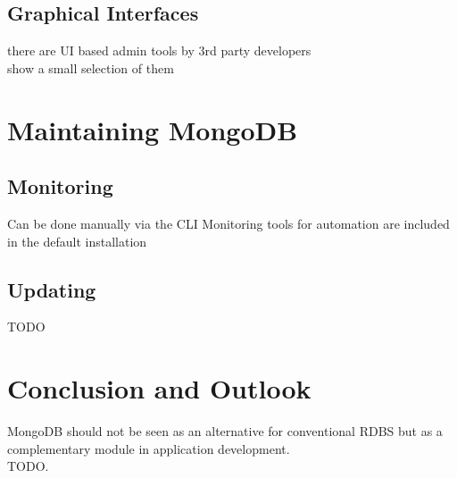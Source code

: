 \subsection{Graphical Interfaces}
\label{sec:usage-gui}
there are UI based admin tools by 3rd party developers\\
show a small selection of them

\section{Maintaining MongoDB}
\label{sec:maintenance}

\subsection{Monitoring}
\label{sec:maintenance-monitroing}
Can be done manually via the CLI
Monitoring tools for automation are included in the default installation

\subsection{Updating}
\label{sec:maintenance-updating}
TODO




\newpage
\section{Conclusion and Outlook}
\label{sec:conclusion}

MongoDB should not be seen as an alternative for conventional RDBS but as a
complementary module in application development.\\
TODO.



